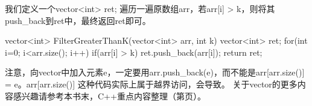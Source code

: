 我们定义一个vector<int> ret; 遍历一遍原数组arr，若arr[i] > k，则将其push\_back到ret中，最终返回ret即可。

\begin{cppcode}
    vector<int> FilterGreaterThanK(vector<int> arr, int k) {
        vector<int> ret;
        for(int i=0; i<arr.size(); i++) {
            if(arr[i] > k) {
                ret.push_back(arr[i]);
            }
        }
        return ret;
    }
\end{cppcode}
注意，向vector中加入元素e，一定要用arr.push\_back(e)，而不能是arr[arr.size()] = e。arr[arr.size()] 这种代码实际上属于越界访问，会导致。
关于vector的更多内容感兴趣请参考本书末，C++重点内容整理（第\pageref{ch:C++重点内容整理}页）。


